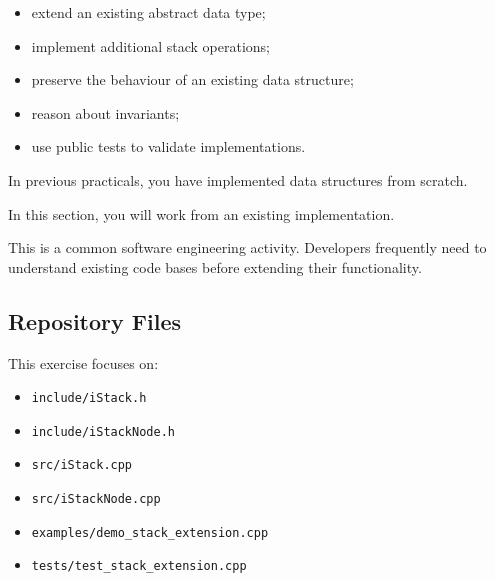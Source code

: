 \documentclass{csc2059practical}
\begin{document}
\begin{learningoutcomes}

\begin{itemize}

\item extend an existing abstract data type;

\item implement additional stack operations;

\item preserve the behaviour of an existing data structure;

\item reason about invariants;

\item use public tests to validate implementations.

\end{itemize}

\end{learningoutcomes}

In previous practicals, you have implemented data structures from
scratch.

In this section, you will work from an existing implementation.

This is a common software engineering activity. Developers frequently
need to understand existing code bases before extending their
functionality.

\subsection*{Repository Files}

This exercise focuses on:

\begin{itemize}

\item \texttt{include/iStack.h}

\item \texttt{include/iStackNode.h}

\item \texttt{src/iStack.cpp}

\item \texttt{src/iStackNode.cpp}

\item \texttt{examples/demo\_stack\_extension.cpp}

\item \texttt{tests/test\_stack\_extension.cpp}

\end{itemize}
\end{document}
